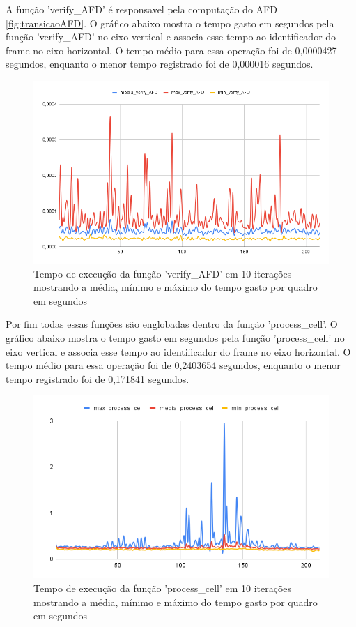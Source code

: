 A função 'verify\_AFD' é responsavel pela computação do \ac{AFD} \ref{fig:transicaoAFD}. O gráfico abaixo mostra o tempo gasto em segundos pela função 'verify\_AFD' no eixo vertical e associa esse tempo ao identificador do frame no eixo horizontal. O tempo médio para essa operação foi de 0,0000427 segundos, enquanto o menor tempo registrado foi de 0,000016 segundos.

\begin{figure}[!htb]
	\centering
	\includegraphics[scale=0.55]{figuras/grafico/verify_AFD.png}
	\caption{Tempo de execução da função 'verify\_AFD' em 10 iterações mostrando a média, mínimo e máximo do tempo gasto por quadro em segundos}
\end{figure}


Por fim todas essas funções são englobadas dentro da função 'process\_cell'. O gráfico abaixo mostra o tempo gasto em segundos pela função 'process\_cell' no eixo vertical e associa esse tempo ao identificador do frame no eixo horizontal. O tempo médio para essa operação foi de 0,2403654 segundos, enquanto o menor tempo registrado foi de 0,171841 segundos. 

\begin{figure}[!htb]
	\centering
	\includegraphics[scale=0.6]{figuras/grafico/process_cell.png}
	\caption{Tempo de execução da função 'process\_cell' em 10 iterações mostrando a média, mínimo e máximo do tempo gasto por quadro em segundos}
\end{figure}

